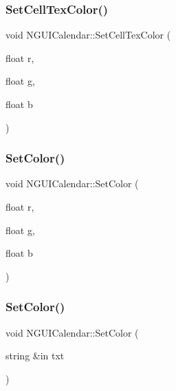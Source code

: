 \hypertarget{class_n_g_u_i_calendar_aa6eac197eabd8721ea72d605b0f0fdf6}{}\label{class_n_g_u_i_calendar_aa6eac197eabd8721ea72d605b0f0fdf6} 
\subsubsection{\texorpdfstring{Set\+Cell\+Tex\+Color()}{SetCellTexColor()}}
{\footnotesize\ttfamily void N\+G\+U\+I\+Calendar\+::\+Set\+Cell\+Tex\+Color (\begin{DoxyParamCaption}\item[{float}]{r,  }\item[{float}]{g,  }\item[{float}]{b }\end{DoxyParamCaption})}

\hypertarget{class_n_g_u_i_calendar_ac95b42a051fad2ac32595e9a9580600b}{}\label{class_n_g_u_i_calendar_ac95b42a051fad2ac32595e9a9580600b} 
\subsubsection{\texorpdfstring{Set\+Color()}{SetColor()}\hspace{0.1cm}{\footnotesize\ttfamily [1/2]}}
{\footnotesize\ttfamily void N\+G\+U\+I\+Calendar\+::\+Set\+Color (\begin{DoxyParamCaption}\item[{float}]{r,  }\item[{float}]{g,  }\item[{float}]{b }\end{DoxyParamCaption})}

\hypertarget{class_n_g_u_i_calendar_a42e61a8b56bd173c6bab49329cd68c2c}{}\label{class_n_g_u_i_calendar_a42e61a8b56bd173c6bab49329cd68c2c} 
\subsubsection{\texorpdfstring{Set\+Color()}{SetColor()}\hspace{0.1cm}{\footnotesize\ttfamily [2/2]}}
{\footnotesize\ttfamily void N\+G\+U\+I\+Calendar\+::\+Set\+Color (\begin{DoxyParamCaption}\item[{string \&in}]{txt }\end{DoxyParamCaption})}

